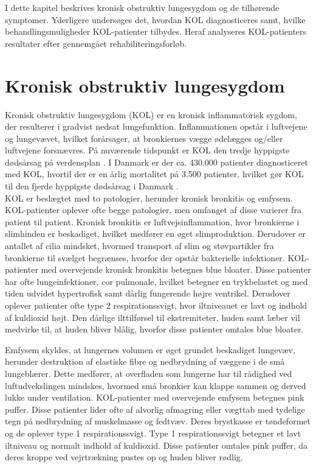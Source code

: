 I dette kapitel beskrives kronisk obstruktiv lungesygdom og de tilhørende symptomer. Yderligere undersøges det, hvordan KOL diagnosticeres samt, hvilke behandlingsmuligheder KOL-patienter tilbydes. Heraf analyseres KOL-patienters resultater efter gennemgået rehabiliteringsforløb.

\section{Kronisk obstruktiv lungesygdom}
Kronisk obstruktiv lungesygdom (KOL) er en kronisk inflammatorisk sygdom, der resulterer i gradvist nedsat lungefunktion. Inflammationen opstår i luftvejene og lungevævet, hvilket forårsager, at bronkiernes vægge ødelægges og/eller luftvejene forsnævres. På nuværende tidspunkt er KOL den tredje hyppigste dødsårsag på verdensplan \cite{WHO2017}. I Danmark er der ca. 430.000 patienter diagnosticeret med KOL, hvortil der er en årlig mortalitet på 3.500 patienter, hvilket gør KOL til den fjerde hyppigste dødsårsag i Danmark \cite{Basisbogen2016}.
\\
KOL er beslægtet med to patologier, herunder kronisk bronkitis og emfysem. KOL-patienter oplever ofte begge patologier, men omfanget af disse varierer fra patient til patient.\cite{Basisbogen2016}
Kronisk bronkitis er luftvejsinflammation, hvor bronkierne i slimhinden er beskadiget, hvilket medfører en øget slimproduktion. Derudover er antallet af cilia mindsket, hvormed transport af slim og støvpartikler fra bronkierne til svælget begrænses, hvorfor der opstår bakterielle infektioner.\cite{Frausing2011,Britannica2016} KOL-patienter med overvejende kronisk bronkitis betegnes blue bloater. Disse patienter har ofte lungeinfektioner, cor pulmonale, hvilket betegner en trykbelastet og med tiden udvidet hypertrofisk samt dårlig fungerende højre ventrikel. Derudover oplever patienter ofte  type 2 respirationssvigt, hvor iltniveauet er lavt og indhold af kuldioxid højt. Den dårlige ilttilførsel til ekstremiteter, huden samt læber vil medvirke til, at huden bliver blålig, hvorfor disse patienter omtales blue bloater.\cite{Healthguidances2016}

Emfysem skyldes, at lungernes volumen er øget grundet beskadiget lungevæv, herunder destruktion af elastiske fibre og nedbrydning af væggene i de små lungeblærer. Dette medfører, at overfladen som lungerne har til rådighed ved luftudvekslingen mindskes, hvormed små bronkier kan klappe sammen og derved lukke under ventilation.\cite{Frausing2011a,Flaschen-Hansen2008} KOL-patienter med overvejende emfysem betegnes pink puffer. Disse patienter lider ofte af alvorlig afmagring eller vægttab med tydelige tegn på nedbrydning af muskelmasse og fedtvæv. Deres brystkasse er tøndeformet og de oplever type 1 respirationssvigt. Type 1 respirationssvigt betegner et lavt iltniveau og normalt indhold af kuldioxid. Disse patienter omtales pink puffer, da deres kroppe ved vejrtrækning pustes op og huden bliver rødlig.\cite{Healthguidances2016}

